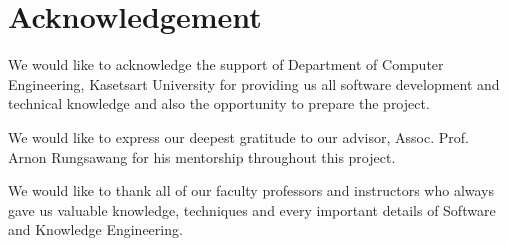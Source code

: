 \chapter*{Acknowledgement}
\label{chap:acknowledgement}

We would like to acknowledge the support of Department of Computer Engineering, Kasetsart University for providing us all
software development and technical knowledge and also the opportunity to prepare the project.

We would like to express our deepest gratitude to our advisor, Assoc. Prof. Arnon Rungsawang for his mentorship throughout this project.

We would like to thank all of our faculty professors and instructors who always gave us valuable knowledge, techniques and
every important details of Software and Knowledge Engineering.

\vspace{.2in}
\begin{flushright}
    \usevar{\srsAuthorOne} \\
    \usevar{\srsAuthorTwo} \\
    \usevar{\srsAuthorThree}
\end{flushright}